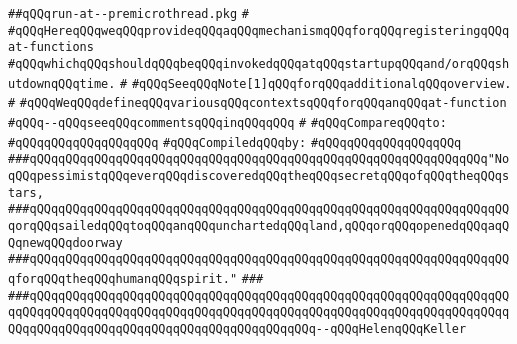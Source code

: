 \label{src/lib/std/src/nj/run-at--premicrothread.pkg}
\verb|##qQQqrun-at--premicrothread.pkg|\newline
\verb|#|\newline
\verb|#qQQqHereqQQqweqQQqprovideqQQqaqQQqmechanismqQQqforqQQqregisteringqQQqat-functions|\newline
\verb|#qQQqwhichqQQqshouldqQQqbeqQQqinvokedqQQqatqQQqstartupqQQqand/orqQQqshutdownqQQqtime.|\newline
\verb|#|\newline
\verb|#qQQqSeeqQQqNote[1]qQQqforqQQqadditionalqQQqoverview.|\newline
\verb|#|\newline
\verb|#qQQqWeqQQqdefineqQQqvariousqQQqcontextsqQQqforqQQqanqQQqat-function|\newline
\verb|#qQQq--qQQqseeqQQqcommentsqQQqinqQQqqQQq|\newline
\verb|#|\newline
\verb|#qQQqCompareqQQqto:|\newline
\verb|#qQQqqQQqqQQqqQQqqQQq|\newline
\newline
\verb|#qQQqCompiledqQQqby:|\newline
\verb|#qQQqqQQqqQQqqQQqqQQq|\newline
\newline
\newline
\newline
\newline
\verb|###qQQqqQQqqQQqqQQqqQQqqQQqqQQqqQQqqQQqqQQqqQQqqQQqqQQqqQQqqQQqqQQq"NoqQQqpessimistqQQqeverqQQqdiscoveredqQQqtheqQQqsecretqQQqofqQQqtheqQQqstars,|\newline
\verb|###qQQqqQQqqQQqqQQqqQQqqQQqqQQqqQQqqQQqqQQqqQQqqQQqqQQqqQQqqQQqqQQqqQQqorqQQqsailedqQQqtoqQQqanqQQqunchartedqQQqland,qQQqorqQQqopenedqQQqaqQQqnewqQQqdoorway|\newline
\verb|###qQQqqQQqqQQqqQQqqQQqqQQqqQQqqQQqqQQqqQQqqQQqqQQqqQQqqQQqqQQqqQQqqQQqforqQQqtheqQQqhumanqQQqspirit."|\newline
\verb|###|\newline
\verb|###qQQqqQQqqQQqqQQqqQQqqQQqqQQqqQQqqQQqqQQqqQQqqQQqqQQqqQQqqQQqqQQqqQQqqQQqqQQqqQQqqQQqqQQqqQQqqQQqqQQqqQQqqQQqqQQqqQQqqQQqqQQqqQQqqQQqqQQqqQQqqQQqqQQqqQQqqQQqqQQqqQQqqQQqqQQqqQQqqQQq--qQQqHelenqQQqKeller|\newline
